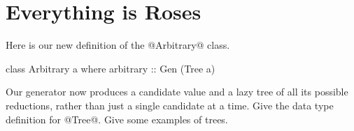 \section{Everything is Roses}

Here is our new definition of the @Arbitrary@ class.

\begin{code}
class Arbitrary a where
   arbitrary :: Gen (Tree a)
\end{code}

Our generator now produces a candidate value and a lazy tree of all its possible reductions, rather than just a single candidate at a time. Give the data type definition for @Tree@. Give some examples of trees.


